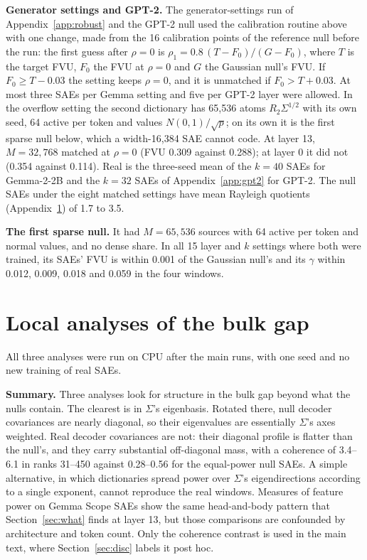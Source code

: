 \documentclass[10pt,twocolumn]{article}
\newcommand{\Sig}{\Sigma}
\begin{document}
\textbf{Generator settings and GPT-2.} The generator-settings run of Appendix~\ref{app:robust} and the GPT-2 null used the calibration routine above with one change, made from the 16 calibration points of the reference null before the run: the first guess after $\rho=0$ is $\rho_1 = 0.8\,(T-F_0)/(G-F_0)$, where $T$ is the target FVU, $F_0$ the FVU at $\rho=0$ and $G$ the Gaussian null's FVU. If $F_0 \ge T-0.03$ the setting keeps $\rho=0$, and it is unmatched if $F_0 > T+0.03$. At most three SAEs per Gemma setting and five per GPT-2 layer were allowed. In the overflow setting the second dictionary has 65,536 atoms $R_2\Sig^{1/2}$ with its own seed, 64 active per token and values $N(0,1)/\sqrt{p}$; on its own it is the first sparse null below, which a width-16,384 SAE cannot code. At layer 13, $M=32{,}768$ matched at $\rho=0$ (FVU 0.309 against 0.288); at layer 0 it did not (0.354 against 0.114). Real is the three-seed mean of the $k=40$ SAEs for Gemma-2-2B and the $k=32$ SAEs of Appendix~\ref{app:gpt2} for GPT-2. The null SAEs under the eight matched settings have mean Rayleigh quotients (Appendix~\ref{app:local}) of 1.7 to 3.5.

\textbf{The first sparse null.} It had $M=65{,}536$ sources with 64 active per token and normal values, and no dense share. In all 15 layer and $k$ settings where both were trained, its SAEs' FVU is within 0.001 of the Gaussian null's and its $\gamma$ within 0.012, 0.009, 0.018 and 0.059 in the four windows.

\section{Local analyses of the bulk gap}
\label{app:local}

All three analyses were run on CPU after the main runs, with one seed and no new training of real SAEs.

\textbf{Summary.} Three analyses look for structure in the bulk gap beyond what the nulls contain. The clearest is in $\Sig$'s eigenbasis. Rotated there, null decoder covariances are nearly diagonal, so their eigenvalues are essentially $\Sig$'s axes weighted. Real decoder covariances are not: their diagonal profile is flatter than the null's, and they carry substantial off-diagonal mass, with a coherence of 3.4--6.1 in ranks 31--450 against 0.28--0.56 for the equal-power null SAEs. A simple alternative, in which dictionaries spread power over $\Sig$'s eigendirections according to a single exponent, cannot reproduce the real windows. Measures of feature power on Gemma Scope SAEs show the same head-and-body pattern that Section~\ref{sec:what} finds at layer 13, but those comparisons are confounded by architecture and token count. Only the coherence contrast is used in the main text, where Section~\ref{sec:disc} labels it post hoc.
\end{document}

